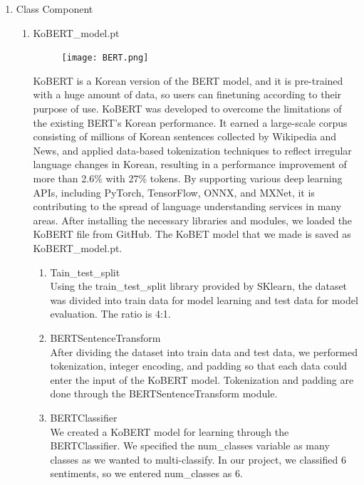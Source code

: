 \documentclass[conference]{IEEEtran}
\begin{document}
\begin{enumerate}
\begin{enumerate}
            \item Class Component
            \begin{enumerate}
                \item KoBERT\_model.pt
                \begin{figure}[H]
                 \centering
                 \texttt{[image: BERT.png]}
                 \end{figure}
                KoBERT is a Korean version of the BERT model, and it is pre-trained with a huge amount of data, so users can finetuning according to their purpose of use. KoBERT was developed to overcome the limitations of the existing BERT's Korean performance. It earned a large-scale corpus consisting of millions of Korean sentences collected by Wikipedia and News, and applied data-based tokenization techniques to reflect irregular language changes in Korean, resulting in a performance improvement of more than 2.6\% with 27\% tokens. By supporting various deep learning APIs, including PyTorch, TensorFlow, ONNX, and MXNet, it is contributing to the spread of language understanding services in many areas. After installing the necessary libraries and modules, we loaded the KoBERT file from GitHub. The KoBET model that we made is saved as KoBERT\_model.pt.\newline
                \begin{enumerate}
                     \item Tain\_test\_split
                \\Using the train\_test\_split library provided by SKlearn, the dataset was divided into train data for model learning and test data for model evaluation. The ratio is 4:1.\newline
                \item BERTSentenceTransform
                \\After dividing the dataset into train data and test data, we performed tokenization, integer encoding, and padding so that each data could enter the input of the KoBERT model. Tokenization and padding are done through the BERTSentenceTransform module.\newline \newline
                \item BERTClassifier
                \\We created a KoBERT model for learning through the BERTClassifier. We specified the num\_classes variable as many classes as we wanted to multi-classify. In our project, we classified 6 sentiments, so we entered num\_classes as 6.\newline

\end{enumerate}
\end{enumerate}
\end{enumerate}
\end{enumerate}
\end{document}
